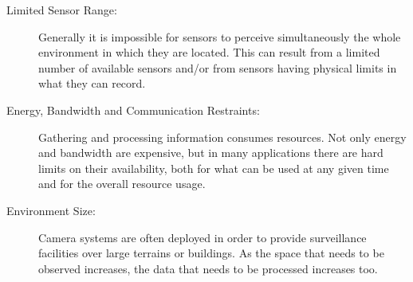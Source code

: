 \begin{description}

\item[Limited Sensor Range:] Generally it is impossible for sensors to perceive simultaneously the
    whole environment in which they are located. This can result from a limited number of available
    sensors and/or from sensors having physical limits in what they can record.

%


\item[Energy, Bandwidth and Communication Restraints:] Gathering and processing information consumes
    resources. Not only energy and bandwidth are expensive, but in many applications there are hard
    limits on their availability, both for what can be used at any given time and for the overall
    resource usage.

\item[Environment Size:] Camera systems are often deployed in order to provide surveillance
    facilities over large terrains or buildings. As the space that needs to be observed increases, the
    data that needs to be processed increases too.


\end{description}


